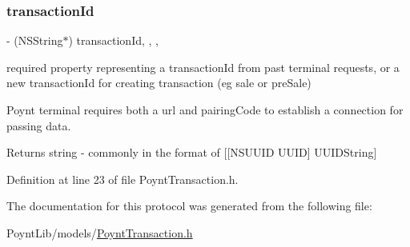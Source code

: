 \subsubsection{\texorpdfstring{transaction\+Id}{transactionId}}
{\footnotesize\ttfamily -\/ (N\+S\+String$\ast$) transaction\+Id\hspace{0.3cm}{\ttfamily [read]}, {\ttfamily [write]}, {\ttfamily [nonatomic]}, {\ttfamily [copy]}}



required property representing a transaction\+Id from past terminal requests, or a new transaction\+Id for creating transaction (eg sale or pre\+Sale) 

Poynt terminal requires both a url and pairing\+Code to establish a connection for passing data.

\begin{DoxyReturn}{Returns}
string -\/ commonly in the format of {\ttfamily }\mbox{[}\mbox{[}N\+S\+U\+U\+ID U\+U\+ID\mbox{]} U\+U\+I\+D\+String\mbox{]} 
\end{DoxyReturn}


Definition at line 23 of file Poynt\+Transaction.\+h.



The documentation for this protocol was generated from the following file\+:\begin{DoxyCompactItemize}
\item 
Poynt\+Lib/models/\hyperlink{_poynt_transaction_8h}{Poynt\+Transaction.\+h}\end{DoxyCompactItemize}
